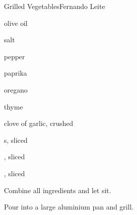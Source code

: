 \begin{recipe}{Grilled Vegetables}{Fernando Leite}{}

\begin{ingredients}
\item olive oil
\item salt
\item pepper
\item paprika
\item oregano
\item thyme
\item clove of garlic, crushed
\item {}s, sliced
\item {}, sliced
\item {}, sliced
\end{ingredients}

\begin{directions}
\item Combine all ingredients and let sit.
\item Pour into a large aluminium pan and grill.
\end{directions}

\end{recipe}
